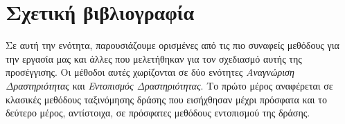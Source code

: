 


% 


% 
\gr
\chapter{Σχετική βιβλιογραφία}
Σε αυτή την ενότητα, παρουσιάζουμε ορισμένες από τις πιο συναφείς μεθόδους για την εργασία μας και άλλες που μελετήθηκαν για τον σχεδιασμό αυτής της προσέγγισης.
Οι μέθοδοι αυτές  χωρίζονται σε δύο ενότητες \textit{Aναγνώριση Δραστηριότητας} και \textit{Εντοπισμός Δραστηριότητας}. Το πρώτο μέρος αναφέρεται σε κλασικές μεθόδους
ταξινόμησης δράσης που εισήχθησαν μέχρι πρόσφατα και το δεύτερο μέρος, αντίστοιχα, σε πρόσφατες μεθόδους εντοπισμού της δράσης. 


